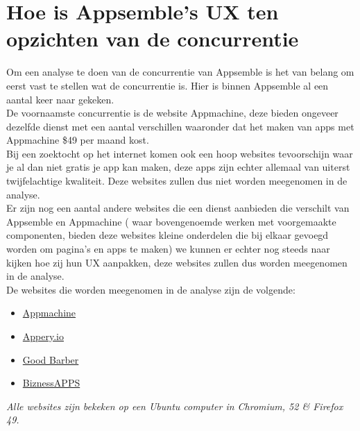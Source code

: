 \chapter{Hoe is Appsemble’s UX ten opzichten van de concurrentie}
Om een analyse te doen van de concurrentie van Appsemble is het van belang om eerst vast te stellen wat de concurrentie is. Hier is binnen Appsemble al een aantal keer naar gekeken.\\
\newline
%
De voornaamste concurrentie is de website Appmachine, deze bieden ongeveer dezelfde dienst met een aantal verschillen waaronder dat het maken van apps met Appmachine \$49 per maand kost. \\
\newline
%
Bij een zoektocht op het internet komen ook een hoop websites tevoorschijn waar je al dan niet gratis je app kan maken, deze apps zijn echter allemaal van uiterst twijfelachtige kwaliteit. Deze websites zullen dus niet worden meegenomen in de analyse.\\
\newline
%
Er zijn nog een aantal andere websites die een dienst aanbieden die verschilt van Appsemble en 
Appmachine ( waar bovengenoemde werken met voorgemaakte componenten, bieden deze websites kleine onderdelen die bij elkaar gevoegd worden om pagina’s en apps te maken) we kunnen er echter nog steeds naar kijken hoe zij hun UX aanpakken, deze websites zullen dus worden meegenomen in de analyse.\\
\newline
De websites die worden meegenomen in de analyse zijn de volgende:
\begin{itemize}
	\item \href{http://www.appmachine.com/}{Appmachine} \cite{appMachine}
	
	\item \href{https://appery.io/}{Appery.io} \cite{appery}
	
	\item \href{http://www.goodbarber.com/}{Good Barber} \cite{goodBarber}
	
	\item \href{https://www.biznessapps.com/}{BiznessAPPS} \cite{biznessApps}
\end{itemize}
\emph{Alle websites zijn bekeken op een Ubuntu computer in Chromium, 52 \& Firefox 49.}\\
\newline

